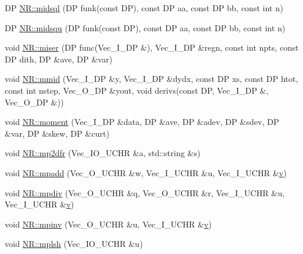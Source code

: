 \begin{DoxyCompactItemize}
\item 
DP \mbox{\hyperlink{namespaceNR_aacb9dcd500af4cc3a665337679bff722}{N\+R\+::midsql}} (DP funk(const DP), const DP aa, const DP bb, const int n)
\item 
DP \mbox{\hyperlink{namespaceNR_a24075c7a2564a7ea0d150a535edc65c6}{N\+R\+::midsqu}} (DP funk(const DP), const DP aa, const DP bb, const int n)
\item 
void \mbox{\hyperlink{namespaceNR_a7633dcff9360f0d1b885d1ea40414046}{N\+R\+::miser}} (DP func(Vec\+\_\+\+I\+\_\+\+DP \&), Vec\+\_\+\+I\+\_\+\+DP \&regn, const int npts, const DP dith, DP \&ave, DP \&var)
\item 
void \mbox{\hyperlink{namespaceNR_afc0314b689ffee95d1fdb24b9fd99e5a}{N\+R\+::mmid}} (Vec\+\_\+\+I\+\_\+\+DP \&y, Vec\+\_\+\+I\+\_\+\+DP \&dydx, const DP xs, const DP htot, const int nstep, Vec\+\_\+\+O\+\_\+\+DP \&yout, void derivs(const DP, Vec\+\_\+\+I\+\_\+\+DP \&, Vec\+\_\+\+O\+\_\+\+DP \&))
\item 
void \mbox{\hyperlink{namespaceNR_aee3fc839b5ac653eb842a2799391942a}{N\+R\+::moment}} (Vec\+\_\+\+I\+\_\+\+DP \&data, DP \&ave, DP \&adev, DP \&sdev, DP \&var, DP \&skew, DP \&curt)
\item 
void \mbox{\hyperlink{namespaceNR_ad5e0bc1358051dfcd1c85d1602c4df5a}{N\+R\+::mp2dfr}} (Vec\+\_\+\+I\+O\+\_\+\+U\+C\+HR \&a, std\+::string \&s)
\item 
void \mbox{\hyperlink{namespaceNR_a2a17c9eb096bee049e90717500cc1d44}{N\+R\+::mpadd}} (Vec\+\_\+\+O\+\_\+\+U\+C\+HR \&w, Vec\+\_\+\+I\+\_\+\+U\+C\+HR \&u, Vec\+\_\+\+I\+\_\+\+U\+C\+HR \&\mbox{\hyperlink{adat__devel_2lib_2hadron_2hadron__timeslice_8cc_a716fc87f5e814be3ceee2405ed6ff22a}{v}})
\item 
void \mbox{\hyperlink{namespaceNR_a86e4bde392036558ab1428a568df4cc7}{N\+R\+::mpdiv}} (Vec\+\_\+\+O\+\_\+\+U\+C\+HR \&q, Vec\+\_\+\+O\+\_\+\+U\+C\+HR \&r, Vec\+\_\+\+I\+\_\+\+U\+C\+HR \&u, Vec\+\_\+\+I\+\_\+\+U\+C\+HR \&\mbox{\hyperlink{adat__devel_2lib_2hadron_2hadron__timeslice_8cc_a716fc87f5e814be3ceee2405ed6ff22a}{v}})
\item 
void \mbox{\hyperlink{namespaceNR_a03e217f2a6e318090794caf6745a6f64}{N\+R\+::mpinv}} (Vec\+\_\+\+O\+\_\+\+U\+C\+HR \&u, Vec\+\_\+\+I\+\_\+\+U\+C\+HR \&\mbox{\hyperlink{adat__devel_2lib_2hadron_2hadron__timeslice_8cc_a716fc87f5e814be3ceee2405ed6ff22a}{v}})
\item 
void \mbox{\hyperlink{namespaceNR_aa8a87e83f0ec64f91eddf8366337192b}{N\+R\+::mplsh}} (Vec\+\_\+\+I\+O\+\_\+\+U\+C\+HR \&u)
\item 

\end{DoxyCompactItemize}
